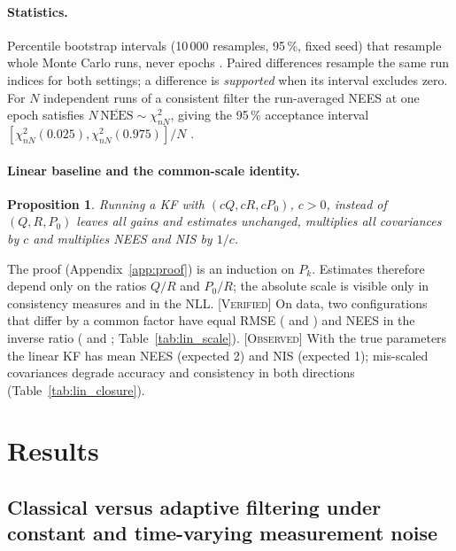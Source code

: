 \documentclass[11pt,a4paper]{article}
\newcommand{\obs}{\textsc{[Observed]}}
\newcommand{\ver}{\textsc{[Verified]}}
\newtheorem{proposition}{Proposition}
\begin{document}
\paragraph{Statistics.} Percentile bootstrap intervals (10\,000 resamples, 95\,\%, fixed seed) that
resample whole Monte Carlo runs, never epochs \citep{efron1979}. Paired differences resample the same
run indices for both settings; a difference is \emph{supported} when its interval excludes zero.
For $N$ independent runs of a consistent filter the run-averaged NEES at one epoch satisfies
$N\,\overline{\mathrm{NEES}}\sim\chi^2_{nN}$, giving the 95\,\% acceptance interval
$[\chi^2_{nN}(0.025),\chi^2_{nN}(0.975)]/N$ \citep{barshalom2001}.

\paragraph{Linear baseline and the common-scale identity.}
\begin{proposition}\label{prop:scale}
Running a KF with $(cQ,cR,cP_0)$, $c>0$, instead of $(Q,R,P_0)$ leaves all gains and estimates
unchanged, multiplies all covariances by $c$ and multiplies NEES and NIS by $1/c$.
\end{proposition}
The proof (Appendix~\ref{app:proof}) is an induction on $P_k$. Estimates therefore depend only on
the ratios $Q/R$ and $P_0/R$; the absolute scale is visible only in consistency measures and in the
NLL. \ver{} On data, two configurations that differ by a common factor have equal RMSE
(\LinScaleRMSEa{} and \LinScaleRMSEb) and NEES in the inverse ratio (\LinScaleNEESa{} and
\LinScaleNEESb; Table~\ref{tab:lin_scale}). \obs{} With the true parameters the linear KF has mean
NEES \LinNomNEES{} (expected 2) and NIS \LinNomNIS{} (expected 1); mis-scaled covariances degrade
accuracy and consistency in both directions (Table~\ref{tab:lin_closure}).

\section{Results}\label{sec:results}

\subsection{Classical versus adaptive filtering under constant and time-varying measurement noise}\label{sec:adaptive}
\end{document}
